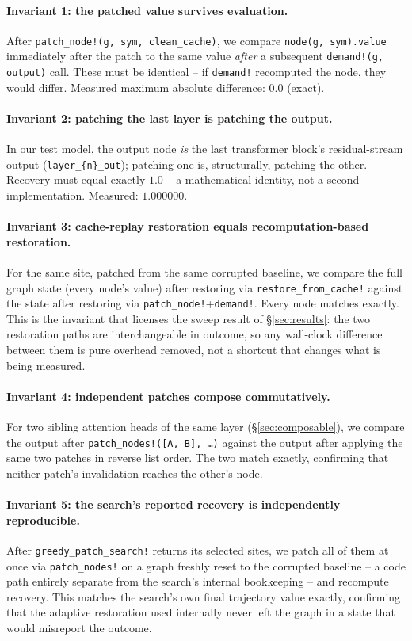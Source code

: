\documentclass{article}
\begin{document}
\paragraph{Invariant 1: the patched value survives evaluation.} After
\texttt{patch\_node!(g, sym, clean\_cache)}, we compare \texttt{node(g, sym).value} immediately
after the patch to the same value \emph{after} a subsequent \texttt{demand!(g, output)} call.
These must be identical -- if \texttt{demand!} recomputed the node, they would differ. Measured
maximum absolute difference: $\mathbf{0.0}$ (exact).

\paragraph{Invariant 2: patching the last layer is patching the output.} In our test model, the
output node \emph{is} the last transformer block's residual-stream output
(\texttt{layer\_\{n\}\_out}); patching one is, structurally, patching the other. Recovery must
equal exactly $1.0$ -- a mathematical identity, not a second implementation. Measured:
$\mathbf{1.000000}$.

\paragraph{Invariant 3: cache-replay restoration equals recomputation-based restoration.} For the
same site, patched from the same corrupted baseline, we compare the full graph state (every
node's value) after restoring via \texttt{restore\_from\_cache!} against the state after
restoring via \texttt{patch\_node!}+\texttt{demand!}. Every node matches exactly. This is the
invariant that licenses the sweep result of \S\ref{sec:results}: the two restoration paths are
interchangeable in outcome, so any wall-clock difference between them is pure overhead removed,
not a shortcut that changes what is being measured.

\paragraph{Invariant 4: independent patches compose commutatively.} For two sibling attention
heads of the same layer (\S\ref{sec:composable}), we compare the output after
\texttt{patch\_nodes!([A, B], \ldots)} against the output after applying the same two patches in
reverse list order. The two match exactly, confirming that neither patch's invalidation reaches
the other's node.

\paragraph{Invariant 5: the search's reported recovery is independently reproducible.} After
\texttt{greedy\_patch\_search!} returns its selected sites, we patch all of them at once via
\texttt{patch\_nodes!} on a graph freshly reset to the corrupted baseline -- a code path entirely
separate from the search's internal bookkeeping -- and recompute recovery. This matches the
search's own final trajectory value exactly, confirming that the adaptive restoration used
internally never left the graph in a state that would misreport the outcome.
\end{document}
